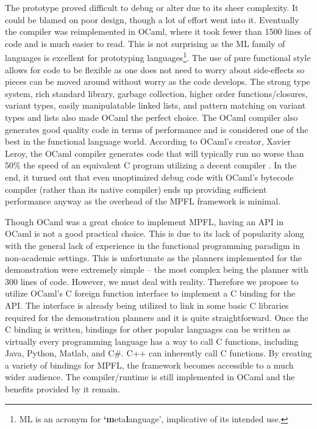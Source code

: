 The prototype proved difficult to debug or alter due to its sheer complexity. It could be blamed on poor design, though a lot of effort went into it. Eventually the compiler was reimplemented in OCaml, where it took fewer than 1500 lines of code and is much easier to read. This is not surprising as the ML family of languages is excellent for prototyping languages\footnote{ML is an acronym for \textbf{`m}eta\textbf{l}anguage', implicative of its intended use.}. The use of pure functional style allows for code to be flexible as one does not need to worry about side-effects so pieces can be moved around without worry as the code develops. The strong type system, rich standard library, garbage collection, higher order functions/closures, variant types, easily manipulatable linked lists, and pattern matching on variant types and lists also made OCaml the perfect choice. The OCaml compiler also generates good quality code in terms of performance and is considered one of the best in the functional language world. According to OCaml's creator, Xavier Leroy, the OCaml compiler generates code that will typically run no worse than 50\% the speed of an equivalent C program utilizing a decent compiler \citep{leroy:ocaml}. In the end, it turned out that even unoptimized debug code with OCaml's bytecode compiler (rather than its native compiler) ends up providing sufficient performance anyway as the overhead of the MPFL framework is minimal.

Though OCaml was a great choice to implement MPFL, having an API in OCaml is not a good practical choice. This is due to its lack of popularity along with the general lack of experience in the functional programming paradigm in non-academic settings. This is unfortunate as the planners implemented for the demonstration were extremely simple -- the most complex being the  planner with 300 lines of code. However, we must deal with reality. Therefore we propose to utilize OCaml's C foreign function interface to implement a C binding for the API. The interface is already being utilized to link in some basic C libraries required for the demonstration planners and it is quite straightforward. Once the C binding is written, bindings for other popular languages can be written as virtually every programming language has a way to call C functions, including Java, Python, Matlab, and C\#. C++ can inherently call C functions. By creating a variety of bindings for MPFL, the framework becomes accessible to a much wider audience. The compiler/runtime is still implemented in OCaml and the benefits provided by it remain.

